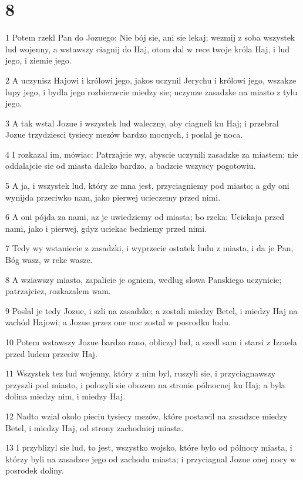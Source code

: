 \chapter{8}

\par 1 Potem rzekl Pan do Jozuego: Nie bój sie, ani sie lekaj; wezmij z soba wszystek lud wojenny, a wstawszy ciagnij do Haj, otom dal w rece twoje króla Haj, i lud jego, i ziemie jego.
\par 2 A uczynisz Hajowi i królowi jego, jakos uczynil Jerychu i królowi jego, wszakze lupy jego, i bydla jego rozbierzecie miedzy sie; uczynze zasadzke na miasto z tylu jego.
\par 3 A tak wstal Jozue i wszystek lud waleczny, aby ciagneli ku Haj; i przebral Jozue trzydziesci tysiecy mezów bardzo mocnych, i poslal je noca.
\par 4 I rozkazal im, mówiac: Patrzajcie wy, abyscie uczynili zasadzke za miastem; nie oddalajcie sie od miasta daleko bardzo, a badzcie wszyscy pogotowiu.
\par 5 A ja, i wszystek lud, który ze mna jest, przyciagniemy pod miasto; a gdy oni wynijda przeciwko nam, jako pierwej ucieczemy przed nimi.
\par 6 A oni pójda za nami, az je uwiedziemy od miasta; bo rzeka: Uciekaja przed nami, jako i pierwej, gdyz uciekac bedziemy przed nimi.
\par 7 Tedy wy wstaniecie z zasadzki, i wyprzecie ostatek ludu z miasta, i da je Pan, Bóg wasz, w reke wasze.
\par 8 A wziawszy miasto, zapalicie je ogniem, wedlug slowa Panskiego uczynicie; patrzajciez, rozkazalem wam.
\par 9 Poslal je tedy Jozue, i szli na zasadzke; a zostali miedzy Betel, i miedzy Haj na zachód Hajowi; a Jozue przez one noc zostal w posrodku ludu.
\par 10 Potem wstawszy Jozue bardzo rano, obliczyl lud, a szedl sam i starsi z Izraela przed ludem przeciw Haj.
\par 11 Wszystek tez lud wojenny, który z nim byl, ruszyli sie, i przyciagnawszy przyszli pod miasto, i polozyli sie obozem na stronie pólnocnej ku Haj; a byla dolina miedzy nim, i miedzy Haj.
\par 12 Nadto wzial okolo pieciu tysiecy mezów, które postawil na zasadzce miedzy Betel, i miedzy Haj, od strony zachodniej miasta.
\par 13 I przyblizyl sie lud, to jest, wszystko wojsko, które bylo od pólnocy miasta, i którzy byli na zasadzce jego od zachodu miasta; i przyciagnal Jozue onej nocy w posrodek doliny.
